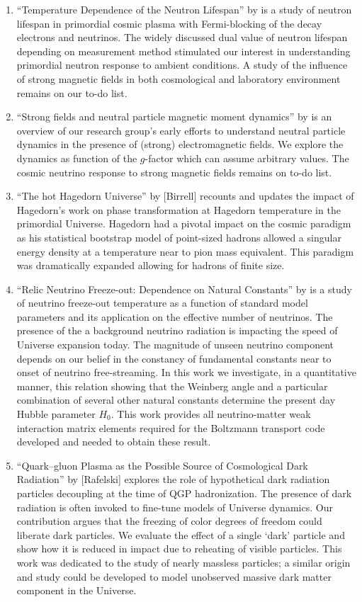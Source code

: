 \begin{enumerate}
%
\item ``Temperature Dependence of the Neutron Lifespan'' by  is a study of neutron lifespan in primordial cosmic plasma with Fermi-blocking of the decay electrons and neutrinos. {\color{black} The widely discussed dual value of neutron lifespan depending on measurement method stimulated our interest in understanding primordial neutron response to ambient conditions. A study of the influence of strong magnetic fields in both cosmological and laboratory environment remains on our to-do list.}
%
\item ``Strong fields and neutral particle magnetic moment dynamics'' by  is an overview of our research group's early efforts to understand neutral particle dynamics in the presence of (strong) electromagnetic fields. {\color{black} We explore the dynamics as function of the $g$-factor which can assume arbitrary values. The cosmic neutrino response to strong magnetic fields remains on to-do list.}
%
\item ``The hot Hagedorn Universe'' by [Birrell] {\color{black} recounts and updates the impact of Hagedorn's work on phase transformation at Hagedorn temperature in the primordial Universe. Hagedorn had a pivotal impact on the cosmic paradigm as his statistical bootstrap model of point-sized hadrons allowed a singular energy density at a temperature near to pion mass equivalent. This paradigm was dramatically expanded allowing for hadrons of finite size.}
%
\item ``Relic Neutrino Freeze-out: Dependence on Natural Constants'' by  is a study of neutrino freeze-out temperature as a function of standard model parameters and its application on the effective number of neutrinos. {\color{black} The presence of the a background neutrino radiation is impacting the speed of Universe expansion today. The magnitude of unseen neutrino component depends on our belief in the constancy of fundamental constants near to onset of neutrino free-streaming. In this work we investigate, in a quantitative manner, this relation showing  that the Weinberg angle and a particular combination of several other natural constants determine the present day Hubble parameter $H_0$. This work provides all neutrino-matter weak interaction matrix elements required for the Boltzmann transport code developed and needed to obtain these result.}
%
\item ``Quark–gluon Plasma as the Possible Source of Cosmological Dark Radiation'' by [Rafelski] {\color{black} explores the role of hypothetical dark radiation particles decoupling at the time of QGP hadronization. The presence of dark radiation is often invoked to fine-tune models of Universe dynamics. Our contribution argues that the freezing of color degrees of freedom could liberate dark particles. We evaluate the effect of a single `dark' particle and show how it is reduced in impact due to reheating of visible particles. This work was dedicated to the study of nearly massless particles; a similar origin and study could be developed to model unobserved massive dark matter component in the Universe. }

\end{enumerate}
